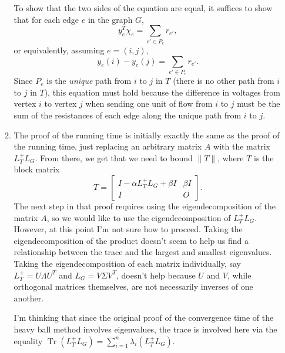 \documentclass{article}
\newcommand{\0}{\mathbf{0}}
\DeclareMathOperator{\Tr}{Tr}
\begin{document}
\begin{enumerate}
\begin{enumerate}
    To show that the two sides of the equation are equal, it suffices to show that for each edge $e$ in the graph $G$,
    \begin{equation*}
      y_e^T \chi_e = \sum_{e' \in P_e} r_{e'},
    \end{equation*}
    or equivalently, assuming $e = (i, j)$,
    \begin{equation*}
      y_e(i) - y_e(j) = \sum_{e' \in P_e} r_{e'}.
    \end{equation*}
    Since $P_e$ is the \emph{unique} path from $i$ to $j$ in $T$ (there is no other path from $i$ to $j$ in $T$), this equation must hold because the difference in voltages from vertex $i$ to vertex $j$ when sending one unit of flow from $i$ to $j$ must be the sum of the resistances of each edge along the unique path from $i$ to $j$.
  \item
    The proof of the running time is initially exactly the same as the proof of the running time, just replacing an arbitrary matrix $A$ with the matrix $L_T^+ L_G$.
    From there, we get that we need to bound $\|T\|$, where $T$ is the block matrix
    \begin{equation*}
      T =
      \begin{bmatrix}
        I - \alpha L_T^+ L_G + \beta I & \beta I \\
        I & O
      \end{bmatrix}.
    \end{equation*}
    The next step in that proof requires using the eigendecomposition of the matrix $A$, so we would like to use the eigendecomposition of $L_T^+ L_G$.
    However, at this point I'm not sure how to proceed.
    Taking the eigendecomposition of the product doesn't seem to help us find a relationship between the trace and the largest and smallest eigenvalues.
    Taking the eigendecomposition of each matrix individually, say $L_T^+ = U \Lambda U^T$ and $L_G = V \Sigma V^T$, doesn't help because $U$ and $V$, while orthogonal matrices themselves, are not necessarily inverses of one another.

    I'm thinking that since the original proof of the convergence time of the heavy ball method involves eigenvalues, the trace is involved here via the equality $\Tr(L_T^+ L_G) = \sum_{i = 1}^n \lambda_i(L_T^+ L_G)$.
  \end{enumerate}
\end{enumerate}

\printbibliography
\end{document}
